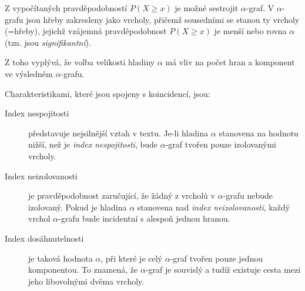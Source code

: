 \documentclass[dp.tex]{subfiles}
\begin{document}
Z vypočítaných pravděpodobností $P(X \geq x)$ je možné sestrojit $\alpha$-graf. V $\alpha$-grafu jsou hřeby zakresleny jako vrcholy, přičemž sousedními se stanou ty vrcholy (=hřeby), jejichž vzájemná pravděpodobnost $P(X \geq x)$ je menší nebo rovna $\alpha$ (tzn. jsou \textit{signifikantní}).

Z toho vyplývá, že volba velikosti hladiny $\alpha$ má vliv na počet hran a komponent ve výsledném $\alpha$-grafu. 

Charakteristikami, které jsou spojeny s koincidencí, jsou:
\begin{description}
	\item[Index nespojitosti] představuje nejsilnější vztah v textu. Je-li hladina $\alpha$ stanovena na hodnotu nižší, než je \textit{index nespojitosti}, bude $\alpha$-graf tvořen pouze izolovanými vrcholy.
	\item[Index neizolovanosti] je pravděpodobnost zaručující, že žádný z vrcholů v $\alpha$-grafu nebude izolovaný. Pokud je hladina $\alpha$ stanovena nad \textit{index neizolovanosti}, každý vrchol $\alpha$-grafu bude incidentní s alespoň jednou hranou.
	\item[Index dosáhnutelnosti] je taková hodnota $\alpha$, při které je celý $\alpha$-graf tvořen pouze jednou komponentou. To znamená, že $\alpha$-graf je souvislý a tudíž existuje cesta mezi jeho libovolnými dvěma vrcholy.
\end{description}
\end{document}
